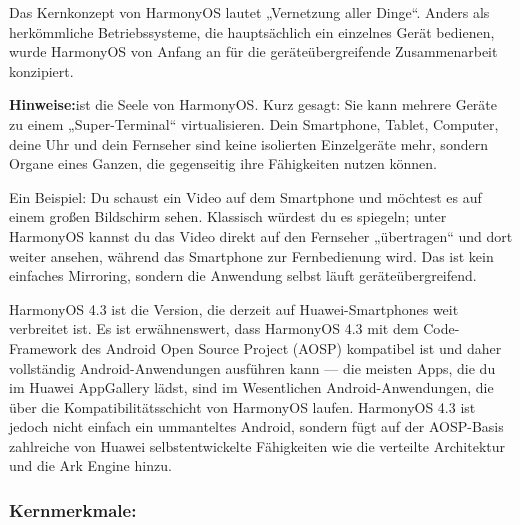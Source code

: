 


Das Kernkonzept von HarmonyOS lautet „Vernetzung aller Dinge“. Anders als herkömmliche Betriebssysteme, die hauptsächlich ein einzelnes Gerät bedienen, wurde HarmonyOS von Anfang an für die geräteübergreifende Zusammenarbeit konzipiert.

\textbf{Hinweise:}ist die Seele von HarmonyOS. Kurz gesagt: Sie kann mehrere Geräte zu einem „Super-Terminal“ virtualisieren. Dein Smartphone, Tablet, Computer, deine Uhr und dein Fernseher sind keine isolierten Einzelgeräte mehr, sondern Organe eines Ganzen, die gegenseitig ihre Fähigkeiten nutzen können.

Ein Beispiel: Du schaust ein Video auf dem Smartphone und möchtest es auf einem großen Bildschirm sehen. Klassisch würdest du es spiegeln; unter HarmonyOS kannst du das Video direkt auf den Fernseher „übertragen“ und dort weiter ansehen, während das Smartphone zur Fernbedienung wird. Das ist kein einfaches Mirroring, sondern die Anwendung selbst läuft geräteübergreifend.


HarmonyOS 4.3 ist die Version, die derzeit auf Huawei-Smartphones weit verbreitet ist. Es ist erwähnenswert, dass HarmonyOS 4.3 mit dem Code-Framework des Android Open Source Project (AOSP) kompatibel ist und daher vollständig Android-Anwendungen ausführen kann — die meisten Apps, die du im Huawei AppGallery lädst, sind im Wesentlichen Android-Anwendungen, die über die Kompatibilitätsschicht von HarmonyOS laufen. HarmonyOS 4.3 ist jedoch nicht einfach ein ummanteltes Android, sondern fügt auf der AOSP-Basis zahlreiche von Huawei selbstentwickelte Fähigkeiten wie die verteilte Architektur und die Ark Engine hinzu.

\subsubsection*{Kernmerkmale:}


